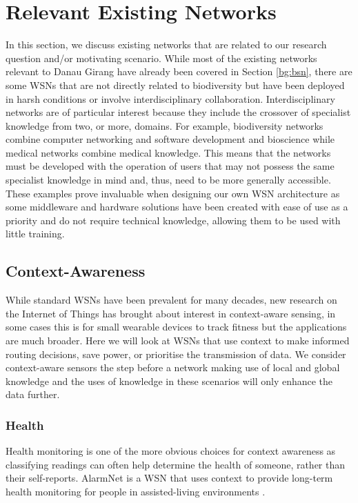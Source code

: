 \section{Relevant Existing Networks} \label{bg:rsn}
	In this section, we discuss existing networks that are related to our research question and/or motivating scenario. While most of the existing networks relevant to Danau Girang have already been covered in Section \ref{bg:bsn}, there are some WSNs that are not directly related to biodiversity but have been deployed in harsh conditions or involve interdisciplinary collaboration. Interdisciplinary networks are of particular interest because they include the crossover of specialist knowledge from two, or more, domains. For example, biodiversity networks combine computer networking and software development and bioscience while medical networks combine medical knowledge. This means that the networks must be developed with the operation of users that may not possess the same specialist knowledge in mind and, thus, need to be more generally accessible. These examples prove invaluable when designing our own WSN architecture as some middleware and hardware solutions have been created with ease of use as a priority and do not require technical knowledge, allowing them to be used with little training.

\subsection{Context-Awareness}
	While standard WSNs have been prevalent for many decades, new research on the Internet of Things \cite{Atzori2010} has brought about interest in context-aware sensing, in some cases this is for small wearable devices to track fitness but the applications are much broader. Here we will look at WSNs that use context to make informed routing decisions, save power, or prioritise the transmission of data. We consider context-aware sensors the step before a network making use of local and global knowledge and the uses of knowledge in these scenarios will only enhance the data further.

	\subsubsection{Health}
		Health monitoring is one of the more obvious choices for context awareness as classifying readings can often help determine the health of someone, rather than their self-reports. AlarmNet is a WSN that uses context to provide long-term health monitoring for people in assisted-living environments \cite{Wood}.
	
